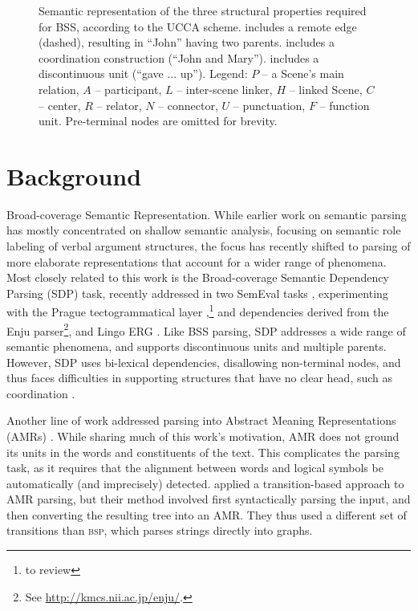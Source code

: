 \documentclass[11pt]{article}
\makeatletter
\newcommand{\daniel}[1]{\footnote{\color{blue} #1}}
\renewcommand{\paragraph}{
  \@startsection{paragraph}{4}
  {\z@}{.5ex \@plus .5ex \@minus .2ex}{-1em}
  {\normalfont\normalsize\bfseries}
}
\makeatother
\begin{document}
\begin{figure}
  \caption{\label{fig:examples}
    Semantic representation of the three structural properties
    required for BSS, according to the UCCA scheme.  includes a remote edge (dashed),
    resulting in ``John'' having two parents. %
     includes a coordination construction (``John and Mary'').
     includes a discontinuous unit (``gave ... up'').
    Legend: $P$ -- a Scene's main relation, $A$ -- participant,
    $L$ -- inter-scene linker, $H$ -- linked Scene, $C$ -- center,
    $R$ -- relator, $N$ -- connector, $U$ -- punctuation, $F$ -- function unit.
    Pre-terminal nodes are omitted for brevity.
}
\end{figure}


\section{Background}\label{sec:background}

\paragraph{Broad-coverage Semantic Representation.}
While earlier work on semantic parsing has mostly concentrated on shallow semantic analysis,
focusing on semantic role labeling of verbal argument structures,
the focus has recently shifted to parsing of more elaborate representations that account
for a wider range of phenomena. 
Most closely related to this work is the Broad-coverage Semantic Dependency Parsing (SDP) task,
recently addressed in two SemEval tasks \cite{oepen2014semeval,oepen2015semeval},
experimenting with the Prague tectogrammatical layer \cite{sgallhp:1986,bohmova2003prague},\daniel{to review}
and dependencies derived from the Enju parser\footnote{See \url{http://kmcs.nii.ac.jp/enju/}.},
and Lingo ERG \cite{Flic:02}.
Like BSS parsing, SDP addresses a wide range of semantic phenomena,
and supports discontinuous units and multiple parents. However, SDP uses
bi-lexical dependencies, disallowing non-terminal nodes, and thus faces difficulties in supporting
structures that have no clear head, such as coordination \cite{Ivanova2012who}.

Another line of work addressed parsing into Abstract Meaning Representations (AMRs)
\cite{flanigan2014discriminative,vanderwende2015amr,pust2015parsing,artzi2015broad}. 
While sharing much of this work's motivation,
AMR does not ground its units in the words and constituents of the text.
This complicates the parsing task, as it requires
that the alignment between words and logical symbols be automatically
(and imprecisely) detected.
 applied a transition-based approach to AMR parsing,
but their method involved first syntactically parsing the input, and then converting
the resulting tree into an AMR. They thus used a different set of transitions than
\textsc{bsp}, which parses strings directly into graphs.
\end{document}
